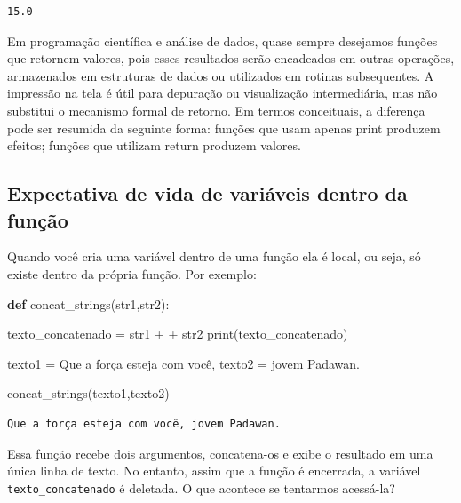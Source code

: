 \documentclass[
  brazilian,
  letterpaper,
  DIV=11,
  numbers=noendperiod]{scrreprt}
\newenvironment{Shaded}{\begin{snugshade}}{\end{snugshade}}
\newcommand{\BuiltInTok}[1]{\textcolor[rgb]{0.00,0.23,0.31}{#1}}
\newcommand{\KeywordTok}[1]{\textcolor[rgb]{0.00,0.23,0.31}{\textbf{#1}}}
\newcommand{\NormalTok}[1]{\textcolor[rgb]{0.00,0.23,0.31}{#1}}
\newcommand{\OperatorTok}[1]{\textcolor[rgb]{0.37,0.37,0.37}{#1}}
\newcommand{\StringTok}[1]{\textcolor[rgb]{0.13,0.47,0.30}{#1}}
\begin{document}
\begin{verbatim}
15.0
\end{verbatim}

Em programação científica e análise de dados, quase sempre desejamos
funções que retornem valores, pois esses resultados serão encadeados em
outras operações, armazenados em estruturas de dados ou utilizados em
rotinas subsequentes. A impressão na tela é útil para depuração ou
visualização intermediária, mas não substitui o mecanismo formal de
retorno. Em termos conceituais, a diferença pode ser resumida da
seguinte forma: funções que usam apenas print produzem efeitos; funções
que utilizam return produzem valores.

\subsection{Expectativa de vida de variáveis dentro da
função}\label{expectativa-de-vida-de-variuxe1veis-dentro-da-funuxe7uxe3o}

Quando você cria uma variável dentro de uma função ela é local, ou seja,
só existe dentro da própria função. Por exemplo:

\begin{Shaded}
\begin{Highlighting}[]
\KeywordTok{def}\NormalTok{ concat\_strings(str1,str2):}
    
\NormalTok{    texto\_concatenado }\OperatorTok{=}\NormalTok{ str1 }\OperatorTok{+} \StringTok{\textquotesingle{} \textquotesingle{}} \OperatorTok{+}\NormalTok{ str2}
    \BuiltInTok{print}\NormalTok{(texto\_concatenado)}
    
\NormalTok{texto1 }\OperatorTok{=} \StringTok{\textquotesingle{}Que a força esteja com você,\textquotesingle{}}
\NormalTok{texto2 }\OperatorTok{=} \StringTok{\textquotesingle{}jovem Padawan.\textquotesingle{}}

\NormalTok{concat\_strings(texto1,texto2)}
\end{Highlighting}
\end{Shaded}

\begin{verbatim}
Que a força esteja com você, jovem Padawan.
\end{verbatim}

Essa função recebe dois argumentos, concatena-os e exibe o resultado em
uma única linha de texto. No entanto, assim que a função é encerrada, a
variável \texttt{texto\_concatenado} é deletada. O que acontece se
tentarmos acessá-la?
\end{document}
